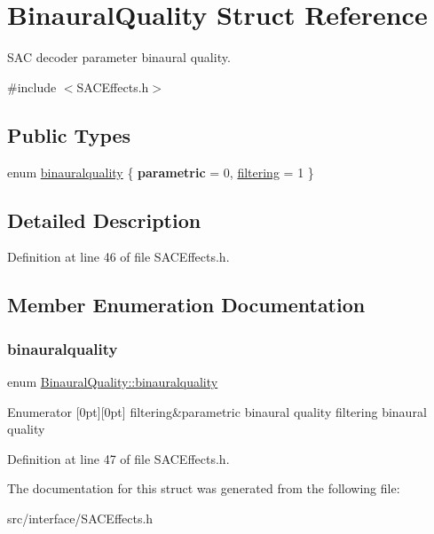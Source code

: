 \hypertarget{struct_binaural_quality}{}\section{Binaural\+Quality Struct Reference}
\label{struct_binaural_quality}


S\+AC decoder parameter binaural quality.  




{\ttfamily \#include $<$S\+A\+C\+Effects.\+h$>$}

\subsection*{Public Types}
\begin{DoxyCompactItemize}
\item 
enum \hyperlink{struct_binaural_quality_a3a009a287684c778dbb5507226cf24e4}{binauralquality} \{ {\bfseries parametric} = 0, 
\hyperlink{struct_binaural_quality_a3a009a287684c778dbb5507226cf24e4a4f6f52196ab75b6d1b20df0d796807fc}{filtering} = 1
 \}
\end{DoxyCompactItemize}


\subsection{Detailed Description}


Definition at line 46 of file S\+A\+C\+Effects.\+h.



\subsection{Member Enumeration Documentation}
\mbox{\label{struct_binaural_quality_a3a009a287684c778dbb5507226cf24e4}} 
\subsubsection{\texorpdfstring{binauralquality}{binauralquality}}
{\footnotesize\ttfamily enum \hyperlink{struct_binaural_quality_a3a009a287684c778dbb5507226cf24e4}{Binaural\+Quality\+::binauralquality}}

\begin{DoxyEnumFields}{Enumerator}
[0pt][0pt]{}\mbox{\label{struct_binaural_quality_a3a009a287684c778dbb5507226cf24e4a4f6f52196ab75b6d1b20df0d796807fc}} 
filtering&parametric binaural quality filtering binaural quality \\
\hline

\end{DoxyEnumFields}


Definition at line 47 of file S\+A\+C\+Effects.\+h.



The documentation for this struct was generated from the following file\+:\begin{DoxyCompactItemize}
\item 
src/interface/S\+A\+C\+Effects.\+h\end{DoxyCompactItemize}
